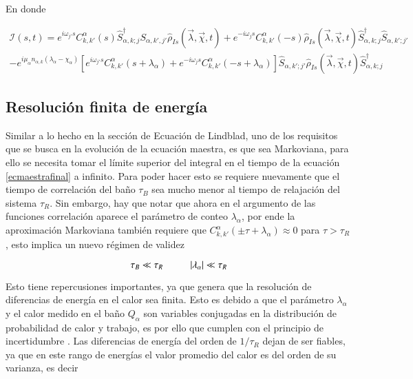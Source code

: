 En donde

\begin{multline*}
    \mathcal{I}(s,t) = e^{i\omega_{j'}s} C^{\alpha}_{k,k'}(s)\hat{S}^{\dagger}_{\alpha,k;j}S_{\alpha,k',j'}\hat{\rho}_{Is}(\vec{\lambda},\vec{\chi},t) + e^{-i\omega_{j}s}C^{\alpha}_{k,k'}(-s)\hat{\rho}_{Is}(\vec{\lambda},\vec{\chi},t)\hat{S}^{\dagger}_{\alpha,k;j}\hat{S}_{\alpha,k';j'} \\
    - e^{i\mu_{\alpha}n_{\alpha,k}(\lambda_{\alpha} - \chi_{\alpha})}\left[e^{i\omega_{j'}s}C^{\alpha}_{k,k'}(s+\lambda_{\alpha}) + e^{-i\omega_{j}s}C^{\alpha}_{k,k'}(-s+\lambda_{\alpha})  \right]  \hat{S}_{\alpha,k';j'}\hat{\rho}_{Is}(\vec{\lambda},\vec{\chi},t)\hat{S}^{\dagger}_{\alpha,k;j}
\end{multline*}

\label{sec2:master}

\subsection{Resolución finita de energía}
Similar a lo hecho en la sección de Ecuación de Lindblad, uno de los requisitos que se busca en la evolución de la ecuación maestra, es que sea Markoviana, para ello se necesita tomar el límite superior del integral en el tiempo de la ecuación \ref{ecmaestrafinal} a infinito. Para poder hacer esto se requiere nuevamente que el tiempo de correlación del baño $\tau_{B}$ sea mucho menor al tiempo de relajación del sistema $\tau_{R}$. Sin embargo, hay que notar que ahora en el argumento de las funciones correlación aparece el parámetro de conteo $\lambda_{\alpha}$, por ende la aproximación Markoviana también requiere que $C^{\alpha}_{k,k'}(\pm \tau + \lambda_\alpha) \approx 0$ para $\tau > \tau_{R}$, esto implica un nuevo régimen de validez

\begin{equation*}
    \tau_{B} \ll \tau_{R} \hspace{10mm} |\lambda_{\alpha}| \ll \tau_{R}
\end{equation*}

Esto tiene repercusiones importantes, ya que genera que la resolución de diferencias de energía en el calor sea finita. Esto es debido a que el parámetro $\lambda_{\alpha}$ y el calor medido en el baño $Q_{\alpha}$ son variables conjugadas en la distribución de probabilidad de calor y trabajo, es por ello que cumplen con el principio de incertidumbre \cite{folland1997uncertainty}. Las diferencias de energía del orden de $1/\tau_{R}$ dejan de ser fiables, ya que en este rango de energías el valor promedio del calor es del orden de su varianza, es decir


